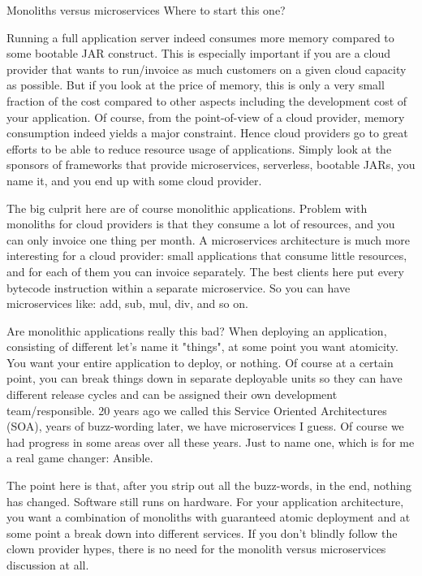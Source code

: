 \begin{ClownComputing}{Monoliths versus microservices}
	Where to start this one?
	
	Running a full application server indeed consumes more memory compared to some bootable JAR construct.
	This is especially important if you are a cloud provider that wants to run/invoice as much customers on a given cloud capacity as possible.
	But if you look at the price of memory, this is only a very small fraction of the cost compared to other aspects including the development cost of your application.
	Of course, from the point-of-view of a cloud provider, memory consumption indeed yields a major constraint.
	Hence cloud providers go to great efforts to be able to reduce resource usage of applications.
	Simply look at the sponsors of frameworks that provide microservices, serverless, bootable JARs, you name it,
	and you end up with some cloud provider.
	
	The big culprit here are of course monolithic applications.
	Problem with monoliths for cloud providers is that they consume a lot of resources, and you can only invoice one thing per month.
	A microservices architecture is much more interesting for a cloud provider: small applications that consume little resources,
	and for each of them you can invoice separately.
	The best clients here put every bytecode instruction within a separate microservice.
	So you can have microservices like: add, sub, mul, div, and so on.
	
	Are monolithic applications really this bad?
	When deploying an application, consisting of different let's name it "things", at some point you want atomicity.
	You want your entire application to deploy, or nothing.
	Of course at a certain point, you can break things down in separate deployable units so they can have different release cycles and can be assigned their own development team/responsible.
	20 years ago we called this Service Oriented Architectures (SOA), years of buzz-wording later, we have microservices I guess.
	Of course we had progress in some areas over all these years. Just to name one, which is for me a real game changer: Ansible.
	
	The point here is that, after you strip out all the buzz-words, in the end, nothing has changed. Software still runs on hardware.
	For your application architecture, you want a combination of monoliths with guaranteed atomic deployment and at some point a break down into different services.
	If you don't blindly follow the clown provider hypes, there is no need for the monolith versus microservices discussion at all.
\end{ClownComputing}

